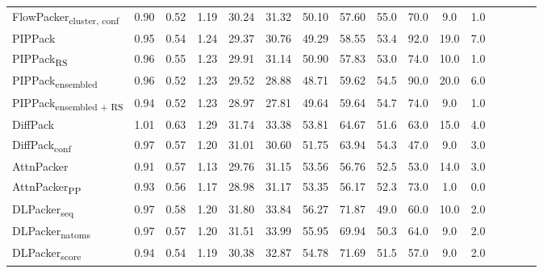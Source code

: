 \begin{table}
{\begin{tabular}{@{}lccccccccccccccc@{}}
                \textnormal{\hspace{0.5cm}FlowPacker\textsubscript{cluster, conf}} & 0.90 & 0.52 & 1.19 & 30.24 & 31.32 & 50.10 & 57.60 & 55.0 & 70.0 & 9.0 & 1.0 \\
                \textnormal{\hspace{0.5cm}PIPPack} & 0.95 & 0.54 & 1.24 & 29.37 & 30.76 & 49.29 & 58.55 & 53.4 & 92.0 & 19.0 & 7.0 \\
                \textnormal{\hspace{0.5cm}PIPPack\textsubscript{RS}} & 0.96 & 0.55 & 1.23 & 29.91 & 31.14 & 50.90 & 57.83 & 53.0 & 74.0 & 10.0 & 1.0 \\
                \textnormal{\hspace{0.5cm}PIPPack\textsubscript{ensembled}} & 0.96 & 0.52 & 1.23 & 29.52 & 28.88 & 48.71 & 59.62 & 54.5 & 90.0 & 20.0 & 6.0 \\
                \textnormal{\hspace{0.5cm}PIPPack\textsubscript{ensembled + RS}} & 0.94 & 0.52 & 1.23 & 28.97 & 27.81 & 49.64 & 59.64 & 54.7 & 74.0 & 9.0 & 1.0 \\
                \textnormal{\hspace{0.5cm}DiffPack} & 1.01 & 0.63 & 1.29 & 31.74 & 33.38 & 53.81 & 64.67 & 51.6 & 63.0 & 15.0 & 4.0 \\
                \textnormal{\hspace{0.5cm}DiffPack\textsubscript{conf}} & 0.97 & 0.57 & 1.20 & 31.01 & 30.60 & 51.75 & 63.94 & 54.3 & 47.0 & 9.0 & 3.0 \\
                \textnormal{\hspace{0.5cm}AttnPacker} & 0.91 & 0.57 & 1.13 & 29.76 & 31.15 & 53.56 & 56.76 & 52.5 & 53.0 & 14.0 & 3.0 \\
                \textnormal{\hspace{0.5cm}AttnPacker\textsubscript{PP}} & 0.93 & 0.56 & 1.17 & 28.98 & 31.17 & 53.35 & 56.17 & 52.3 & 73.0 & 1.0 & 0.0 \\
                \textnormal{\hspace{0.5cm}DLPacker\textsubscript{seq}} & 0.97 & 0.58 & 1.20 & 31.80 & 33.84 & 56.27 & 71.87 & 49.0 & 60.0 & 10.0 & 2.0 \\
                \textnormal{\hspace{0.5cm}DLPacker\textsubscript{natoms}} & 0.97 & 0.57 & 1.20 & 31.51 & 33.99 & 55.95 & 69.94 & 50.3 & 64.0 & 9.0 & 2.0 \\
                \textnormal{\hspace{0.5cm}DLPacker\textsubscript{score}} & 0.94 & 0.54 & 1.19 & 30.38 & 32.87 & 54.78 & 71.69 & 51.5 & 57.0 & 9.0 & 2.0 \\

\end{tabular}}
\end{table}
